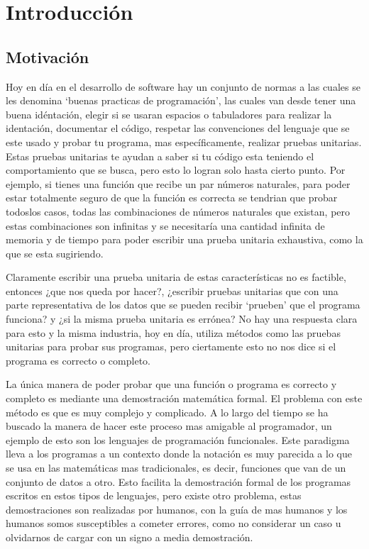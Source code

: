 \chapter{Introducción}

\section{Motivación}
Hoy en día en el desarrollo de software hay un conjunto de normas a las cuales se les denomina
`buenas practicas de programaci\'on', las cuales van desde tener una buena idéntaci\'on, elegir si
se usaran espacios o tabuladores para realizar la identaci\'on, documentar el c\'odigo, respetar
las convenciones del lenguaje que se este usado y probar tu programa, mas específicamente,
realizar pruebas unitarias.
Estas pruebas unitarias te ayudan a saber si tu código esta teniendo el comportamiento que se
busca, pero esto lo logran solo hasta cierto punto. Por ejemplo, si tienes una funci\'on que
recibe un par números naturales, para poder estar totalmente seguro de que la funci\'on es
correcta se tendrian que probar todoslos casos, todas las combinaciones de números naturales que
existan, pero estas combinaciones son infinitas y se necesitaría una cantidad infinita de memoria
y de tiempo para poder escribir una prueba unitaria exhaustiva, como la que se esta sugiriendo.

Claramente escribir una prueba unitaria de estas características no es factible, entonces ¿que nos
queda por hacer?, ¿escribir pruebas unitarias que con una parte representativa de los datos que se
pueden recibir `prueben' que el programa funciona? y ¿si la misma prueba unitaria es errónea? No
hay una respuesta clara para esto y la misma industria, hoy en día, utiliza métodos como las
pruebas unitarias para probar sus programas, pero ciertamente esto no nos dice si el programa es
correcto o completo.

La única manera de poder probar que una función o programa es correcto y completo es mediante una
demostraci\'on matemática formal. El problema con este método es que es muy complejo y complicado.
A lo largo del tiempo se ha buscado la manera de hacer este proceso mas amigable al programador,
un ejemplo de esto son los lenguajes de programación funcionales. Este paradigma lleva a los
programas a un contexto donde la notaci\'on es muy parecida a lo que se usa en las matemáticas mas
tradicionales, es decir, funciones que van de un conjunto de datos a otro. Esto facilita la
demostraci\'on formal de los programas escritos en estos tipos de lenguajes, pero existe otro
problema, estas demostraciones son realizadas por humanos, con la guía de mas humanos y los
humanos somos susceptibles a cometer errores, como no considerar un caso u olvidarnos de cargar
con un signo a media demostraci\'on.

